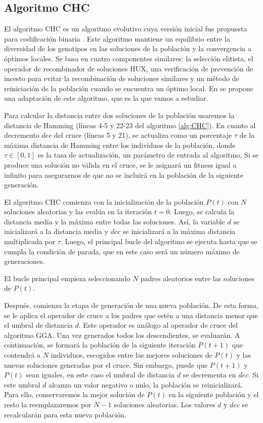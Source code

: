 \subsection{Algoritmo CHC}

El algoritmo CHC es un algoritmo evolutivo cuya versión inicial fue propuesta para codificación binaria \cite{CHC_1991}. Este algoritmo mantiene un equilibrio entre la diversidad de los genotipos en las soluciones de la población y la convergencia a óptimos locales. Se basa en cuatro componentes similares: la selección elitista, el operador de recombinador de soluciones HUX, una verificación de prevención de incesto para evitar la recombinación de soluciones similares y un método de reiniciación de la población cuando se encuentra un óptimo local. En \cite{Cuellar_etal} se propone una adaptación de este algoritmo, que es la que vamos a estudiar.

Para calcular la distancia entre dos soluciones de la población usaremos la distancia de Hamming (líneas 4-5 y 22-23 del algoritmo \ref{alg:CHC}). En cuanto al decremento $dec$ del cruce (líneas 5 y 21), se actualiza como un porcentaje $\tau$ de la máxima distancia de Hamming entre los individuos de la población, donde $\tau \in [0,1]$ es la tasa de actualización, un parámetro de entrada al algoritmo. Si se produce una solución no válida en el cruce, se le asignará un fitness igual a infinito para asegurarnos de que no se incluirá en la población de la siguiente generación.

El algoritmo CHC comienza con la inicialización de la población $P(t)$ con $N$ soluciones aleatorias y las evalúa en la iteración $t = 0$. Luego, se calcula la distancia media y la máxima entre todas las soluciones. Así, la variable $d$ se inicializará a la distancia media y $dec$ se inicializará a la máxima distancia multiplicada por $\tau$. Luego, el principal bucle del algoritmo se ejecuta hasta que se cumpla la condición de parada, que en este caso será un número máximo de generaciones.

El bucle principal empieza seleccionando $N$ padres aleatorios entre las soluciones de $P(t)$.

Después, comienza la etapa de generación de una nueva población. De esta forma, se le aplica el operador de cruce a los padres que estén a una distancia menor que el umbral de distancia $d$. Este operador es análogo al operador de cruce del algoritmo GGA. Una vez generados todos los descendientes, se evaluarán. A continuación, se formará la población de la siguiente iteración $P(t+1)$ que contendrá a $N$ individuos, escogidos entre las mejores soluciones de $P(t)$ y las nuevas soluciones generadas por el cruce. Sin embargo, puede que $P(t+1)$ y $P(t)$ sean iguales, en este caso el umbral de distancia $d$ se decrementa en $dec$. Si este umbral $d$ alcanza un valor negativo o nulo, la población se reinicializará. Para ello, conservaremos la mejor solución de $P(t)$ en la siguiente población y el resto la reemplazaremos por $N-1$ soluciones aleatorias. Los valores $d$ y $dec$ se recalcularán para esta nueva población.


